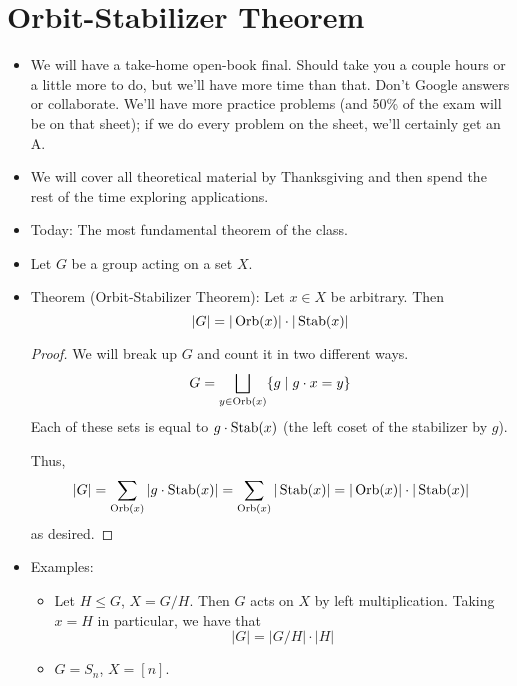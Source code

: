 \documentclass[../notes.tex]{subfiles}
\begin{document}
\section{Orbit-Stabilizer Theorem}
\begin{itemize}
    \item {}We will have a take-home open-book final. Should take you a couple hours or a little more to do, but we'll have more time than that. Don't Google answers or collaborate. We'll have more practice problems (and 50\% of the exam will be on that sheet); if we do every problem on the sheet, we'll certainly get an A.
    \item We will cover all theoretical material by Thanksgiving and then spend the rest of the time exploring applications.
    \item Today: The most fundamental theorem of the class.
    \item Let $G$ be a group acting on a set $X$.
    \item Theorem (Orbit-Stabilizer Theorem): Let $x\in X$ be arbitrary. Then
    \begin{equation*}
        |G| = |\operatorname{Orb}(x)|\cdot|\operatorname{Stab}(x)|
    \end{equation*}
    \begin{proof}
        We will break up $G$ and count it in two different ways.
        \begin{equation*}
            G = \bigsqcup_{y\in\operatorname{Orb}(x)}\{g\mid g\cdot x=y\}
        \end{equation*}
        Each of these sets is equal to $g\cdot\operatorname{Stab}(x)$ (the left coset of the stabilizer by $g$).\par
        Thus,
        \begin{equation*}
            |G| = \sum_{\operatorname{Orb}(x)}|g\cdot\operatorname{Stab}(x)|
            = \sum_{\operatorname{Orb}(x)}|\operatorname{Stab}(x)|
            = |\operatorname{Orb}(x)|\cdot|\operatorname{Stab}(x)|
        \end{equation*}
        as desired.
    \end{proof}
    \item Examples:
    \begin{itemize}
        \item Let $H\leq G$, $X=G/H$. Then $G$ acts on $X$ by left multiplication. Taking $x=H$ in particular, we have that
        \begin{equation*}
            |G| = |G/H|\cdot|H|
        \end{equation*}
        \item $G=S_n$, $X=[n]$.
        \begin{itemize}

\end{itemize}
\end{itemize}
\end{itemize}
\end{document}
